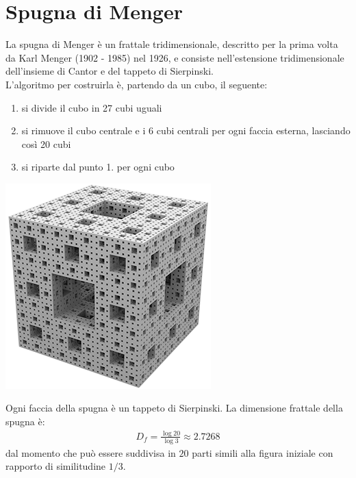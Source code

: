 \documentclass[10pt]{report}
\begin{document}
		\section{Spugna di Menger}
			La spugna di Menger è un frattale tridimensionale, descritto per la prima volta da Karl Menger (1902 - 1985) nel 1926, e consiste nell'estensione tridimensionale dell'insieme di Cantor e del tappeto di Sierpinski.\\
			L'algoritmo per costruirla è, partendo da un cubo, il seguente:
			\begin{enumerate}
				\item si divide il cubo in 27 cubi uguali
				\item si rimuove il cubo centrale e i 6 cubi centrali per ogni faccia esterna, lasciando così 20 cubi
				\item si riparte dal punto 1. per ogni cubo
			\end{enumerate}
			\begin{center}
				\includegraphics[width=0.3\linewidth]{"Spugna di Menger/menger-sponge-sm"}
			\end{center}

			Ogni faccia della spugna è un tappeto di Sierpinski. La dimensione frattale della spugna è:
			\begin{gather*}
				D_f = \frac{ \log20 }{ \log 3 } \approx 2.7268
			\end{gather*}
			dal momento che può essere suddivisa in $20$ parti simili alla figura iniziale con rapporto di similitudine $1/3$.
\end{document}
